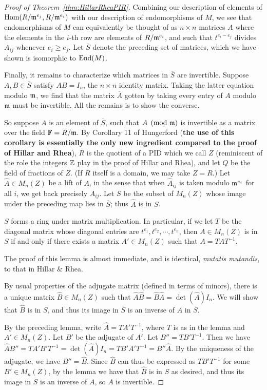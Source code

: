 \begin{proof}[Proof of Theorem~\ref{thm:HillarRheaPIR}]
Combining our description of elements of $\mathrm{Hom}(R/\mathfrak{m}^{e_j}, R/\mathfrak{m}^{e_i})$ with our description of endomorphisms of $M$, we see that endomorphisms of $M$ can equivalently be thought of as $n \times n$ matrices $A$ where the elements in the $i$-th row are elements of $R/\mathfrak{m}^{e_i}$, and such that $t^{e_i - e_j}$ divides $A_{ij}$ whenever $e_i \geq e_j$. Let $\overline{S}$ denote the preceding set of matrices, which we have shown is isomorphic to $\mathrm{End}(M)$.

Finally, it remains to characterize which matrices in $\overline{S}$ are invertible. Suppose $A,B \in \overline{S}$ satisfy $AB = I_n$, the $n \times n$ identity matrix. Taking the latter equation modulo $\mathfrak{m}$, we find that the matrix $\overline{A}$ gotten by taking every entry of $A$ modulo $\mathfrak{m}$ must be invertible. All the remains is to show the converse.

So suppose $A$ is an element of $\overline{S}$, such that $A \pmod{\mathfrak{m}}$ is invertible as a matrix over the field $\mathbb{F} = R/\mathfrak{m}$. By Corollary 11 of Hungerford \cite{hungerford} (\textbf{the use of this corollary is essentially the only new ingredient compared to the proof of Hillar and Rhea}), $R$ is the quotient of a PID which we call $Z$ (reminiscent of the role the integers $\mathbb{Z}$ play in the proof of Hillar and Rhea), and let $Q$ be the field of fractions of $Z$. (If $R$ itself is a domain, we may take $Z=R$.) Let $\hat{A} \in M_n(Z)$ be a lift of $A$, in the sense that when $\hat{A}_{ij}$ is taken modulo $\mathfrak{m}^{e_i}$ for all $i$, we get back precisely $A_{ij}$. Let $S$ be the subset of $M_n(Z)$ whose image under the preceding map lies in $\overline{S}$; thus $\hat{A}$ is in $S$.

\begin{lemma}
$S$ forms a ring under matrix multiplication. In particular, if we let $T$ be the diagonal matrix whose diagonal entries are $t^{e_1}, t^{e_2}, \dotsb, t^{e_n}$, then $A \in M_n(Z)$ is in $S$ if and only if there exists a matrix $A' \in M_n(Z)$ such that $A = TAT^{-1}$.
\end{lemma}

The proof of this lemma is almost immediate, and is identical, \emph{mutatis mutandis}, to that in Hillar \& Rhea.

By usual properties of the adjugate matrix (defined in terms of minors), there is a unique matrix $\hat{B} \in M_n(Z)$ such that $\hat{A}\hat{B} = \hat{B} \hat{A} = \det(\hat{A}) I_n$. We will show that $\hat{B}$ is in $S$, and thus its image in $\overline{S}$ is an inverse of $A$ in $\overline{S}$. 

By the preceding lemma, write $\hat{A} = TA' T^{-1}$, where $T$ is as in the lemma and $A' \in M_n(Z)$. Let $B'$ be the adjugate of $A'$. Let $B'' = TB'T^{-1}$. Then we have $\hat{A} B'' = T A' B' T^{-1} = \det(\hat{A}) I_n = T B' A' T^{-1} = B'' \hat{A}$. By the uniqueness of the adjugate, we have $B'' = \hat{B}$. Since $\hat{B}$ can thus be expressed as $T B' T^{-1}$ for some $B' \in M_n(Z)$, by the lemma we have that $\hat{B}$ is in $S$ as desired, and thus its image in $\overline{S}$ is an inverse of $A$, so $A$ is invertible.
\end{proof}

